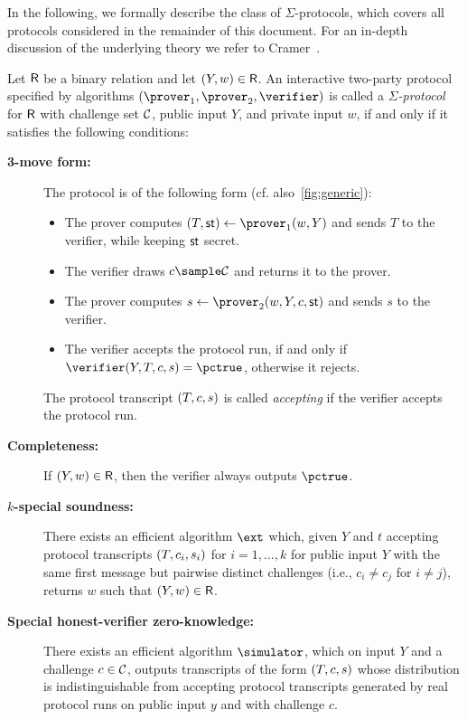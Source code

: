 \documentclass[runningheads]{llncs}
\begin{document}
In the following, we formally describe the class of $\Sigma$-protocols, which covers all protocols considered in the remainder of this document.
 For an in-depth discussion of the underlying theory we refer to Cramer~\cite{cramer97}.
\begin{definition}\label{def:sigma}
  Let $\mathsf{R}$ be a binary relation and let $(Y,w)\in\mathsf{R}$.
  An interactive two-party protocol specified by algorithms $(\prover_1,\prover_2,\verifier)$ is called a \emph{$\Sigma$-protocol} for $\mathsf{R}$ with challenge set $\mathcal{C}$, public input $Y$, and private input $w$, if and only if it satisfies the following conditions:
  \begin{description}
    \item[\bf 3-move form:]
      The protocol is of the following form (cf. also~\cref{fig:generic}):
      \begin{itemize}
        \item
          The prover computes $(\commitment,\st) \gets \prover_1(\witness,\statement)$ and sends $T$ to the verifier, while keeping $\mathsf{st}$ secret.
        \item
          The verifier draws $c\sample\CS$ and returns it to the prover.
        \item
          The prover computes $s\gets\prover_2(\witness,\statement,\challenge,\st)$ and sends $s$ to the verifier.
        \item
          The verifier accepts the protocol run, if and only if $\verifier(Y, T,\challenge,s)=\accept$, otherwise it rejects.
      \end{itemize}
      The protocol transcript $(T,c,s)$ is called \emph{accepting} if the verifier accepts the protocol run.
    \item[\bf Completeness:]
      If $(Y,w)\in\mathsf{R}$, then the verifier always outputs $\accept$.
    \item[\bf $k$-special soundness:]
      There exists an efficient algorithm $\ext$ which, given $Y$ and $t$ accepting protocol transcripts $(T,c_i,s_i)$ for $i=1,\dots,k$ for public input $Y$ with the same first message but pairwise distinct challenges (i.e., $c_i\ne c_j$ for $i\ne j$), returns $w$ such that $(Y,w)\in\mathsf{R}$.
      \item[\bf Special honest-verifier zero-knowledge:]
      There exists an efficient algorithm $\simulator$, which on input $Y$ and a challenge $c\in\mathcal{C}$, outputs transcripts of the form $(T,c,s)$ whose distribution is indistinguishable from accepting protocol transcripts generated by real protocol runs on public input $y$ and with challenge $c$.

\end{description}
\end{definition}
\end{document}
